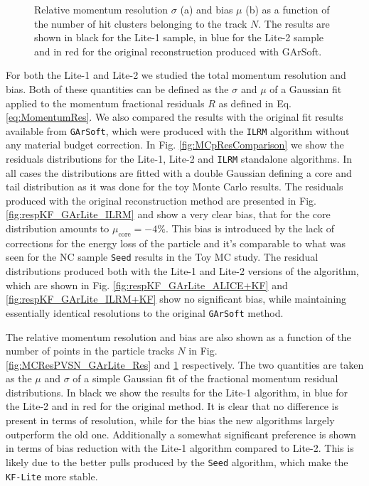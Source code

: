 \begin{figure}[t]
\begin{subfigure}[b]{0.48\textwidth}
         \caption{}
         \label{fig:MCResPVSN_GArLite_Bias}
     \end{subfigure}
        \caption[Relative momentum resolution $\sigma$ (a) and bias $\mu$ (b) as a function of the number of hit clusters belonging to the track $N$.]{Relative momentum resolution $\sigma$ (a) and bias $\mu$ (b) as a function of the number of hit clusters belonging to the track $N$. The results are shown in black for the Lite-1 sample, in blue for the Lite-2 sample and in red for the original reconstruction produced with GArSoft.} \label{fig:MCResPVSN_GArLite}
\end{figure}

For both the Lite-1 and Lite-2 we studied the total momentum resolution and bias. Both of these quantities can be defined as the $\sigma$ and $\mu$ of a Gaussian fit applied to the momentum fractional residuals $R$ as defined in Eq. \ref{eq:MomentumRes}. 
We also compared the results with the original fit results available from \texttt{GArSoft}, which were produced with the \texttt{ILRM} algorithm without any material budget correction. In Fig. \ref{fig:MCpResComparison} we show the residuals distributions for the Lite-1, Lite-2 and \texttt{ILRM} standalone algorithms. In all cases the distributions are fitted with a double Gaussian defining a core and tail distribution as it was done for the toy Monte Carlo results. The residuals produced with the original reconstruction method are presented in Fig. \ref{fig:respKF_GArLite_ILRM} and show a very clear bias, that for the core distribution amounts to $\mu_\text{core}= -4\%$. This bias is introduced by the lack of corrections for the energy loss of the particle and it's comparable to what was seen for the NC sample \texttt{Seed} results in the Toy MC study. The residual distributions produced both with the Lite-1 and Lite-2 versions of the algorithm, which are shown in Fig. \ref{fig:respKF_GArLite_ALICE+KF} and \ref{fig:respKF_GArLite_ILRM+KF} show no significant bias, while maintaining essentially identical resolutions to the original \texttt{GArSoft} method.

The relative momentum resolution and bias are also shown as a function of the number of points in the particle tracks $N$ in Fig. \ref{fig:MCResPVSN_GArLite_Res} and \ref{fig:MCResPVSN_GArLite_Bias} respectively. The two quantities are taken as the $\mu$ and $\sigma$ of a simple Gaussian fit of the fractional momentum residual distributions. In black we show the results for the Lite-1 algorithm, in blue for the Lite-2 and in red for the original method. It is clear that no difference is present in terms of resolution, while for the bias the new algorithms largely outperform the old one. Additionally a somewhat significant preference is shown in terms of bias reduction with the Lite-1 algorithm compared to Lite-2. This is likely due to the better pulls produced by the \texttt{Seed} algorithm, which make the \texttt{KF-Lite} more stable.




